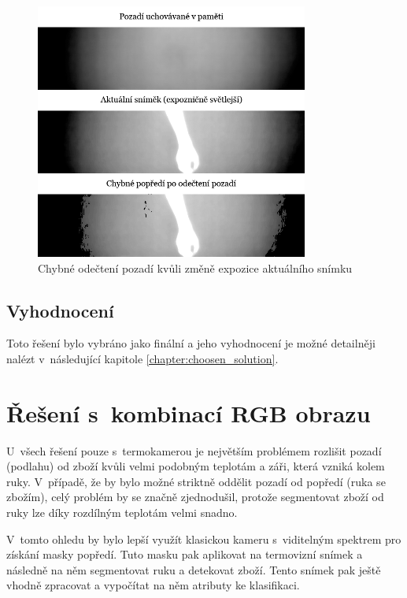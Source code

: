     \begin{figure}[h]
      \centering
      \includegraphics[width=0.8\textwidth]{images/camera_2_apply_mog_after_nuc.png}
      \caption{Chybné odečtení pozadí kvůli změně expozice aktuálního snímku}
      \label{fig:camera_2_apply_mog_after_nuc}
	\end{figure} 

	\subsection{Vyhodnocení}
    Toto řešení bylo vybráno jako finální a jeho vyhodnocení je možné detailněji nalézt v~následující kapitole \ref{chapter:choosen_solution}.
    
\clearpage

\section{Řešení s~kombinací RGB obrazu}\label{section:combining_rgb_and_thermal}
U~všech řešení pouze s~termokamerou je největším problémem rozlišit pozadí (podlahu) od zboží kvůli velmi podobným teplotám a záři, která vzniká kolem ruky. V~případě, že by bylo možné striktně oddělit pozadí od popředí (ruka se zbožím), celý problém by se značně zjednodušil, protože segmentovat zboží od ruky lze díky rozdílným teplotám velmi snadno. 

V~tomto ohledu by bylo lepší využít klasickou kameru s~viditelným spektrem pro získání masky popředí. Tuto masku pak aplikovat na termovizní snímek a následně na něm segmentovat ruku a detekovat zboží. Tento snímek pak ještě vhodně zpracovat a vypočítat na něm atributy ke klasifikaci.

